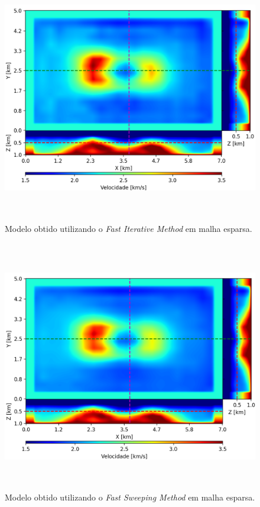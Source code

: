 \begin{figure}[H]
	\centering
	\includegraphics[width=16cm,height=11cm]{Imgs/Resultados/fim_sparse.png}
	\caption{Modelo obtido utilizando o \textit{Fast Iterative Method} em malha esparsa.}
	\label{fig:fim_sparse}	
\end{figure}

\begin{figure}[H]
	\centering
	\includegraphics[width=16cm,height=11cm]{Imgs/Resultados/fsm_sparse.png}
	\caption{Modelo obtido utilizando o \textit{Fast Sweeping Method} em malha esparsa.}
	\label{fig:fsm_sparse}	
\end{figure}


